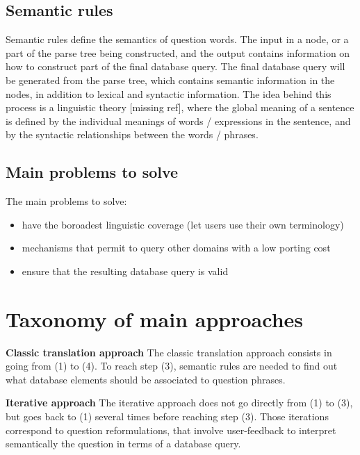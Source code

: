 \documentclass[10pt,journal,letterpaper,compsoc]{IEEEtran}
\begin{document}
\subsection{Semantic rules}
\label{sec:anatomy-semantic-rules}
Semantic rules define the semantics of question words. The input in a node, or a
part of the parse tree being constructed, and the output contains information on
how to construct part of the final database query. The final database query will
be generated from the parse tree, which contains semantic information in the
nodes, in addition to lexical and syntactic information. 
The idea behind this process is a linguistic theory [missing ref], where the
global meaning of a sentence is defined by the individual meanings of words /
expressions in the sentence, and by the syntactic relationships between the
words / phrases. 




\subsection{Main problems to solve}
The main problems to solve:
\begin{itemize}
  \item have the boroadest linguistic coverage (let users use their own
  terminology)
  \item mechanisms that permit to query other domains with a low porting cost
  \item ensure that the resulting database query is valid
\end{itemize}









\section{Taxonomy of main approaches}
\label{sec:overview}




\textbf{Classic translation approach}
The classic translation approach consists in going from (1) to (4).
To reach step (3), semantic rules are needed to find out what database elements
should be associated to question phrases. 

\textbf{Iterative approach}
The iterative approach does not go directly from (1) to (3), but goes back to
(1) several times before reaching step (3). 
Those iterations correspond to question reformulations, that involve
user-feedback to interpret semantically the question in terms of a database
query.
\end{document}
